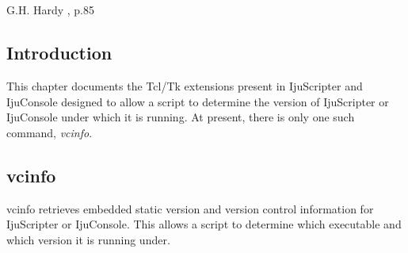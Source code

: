 \chapter{\cvctzerolongtitle{}}

\label{cvct0}

                   {G.H. Hardy \cite{bibref:b:mathematiciansapology:1940},
                   p.85}

\section{Introduction}
This chapter documents the Tcl/Tk extensions present in IjuScripter and IjuConsole
designed to allow a script to determine the version of IjuScripter or IjuConsole under
which it is running.  At present, there is only one such command, \emph{vcinfo}.


\section{vcinfo}

\begin{tclcommandname}{vcinfo}%
retrieves embedded static version and version control information for IjuScripter or IjuConsole.
This allows a script to determine which executable and which version it is
running under.
\end{tclcommandname}

\begin{tclcommandsynopsis}
\end{tclcommandsynopsis}

